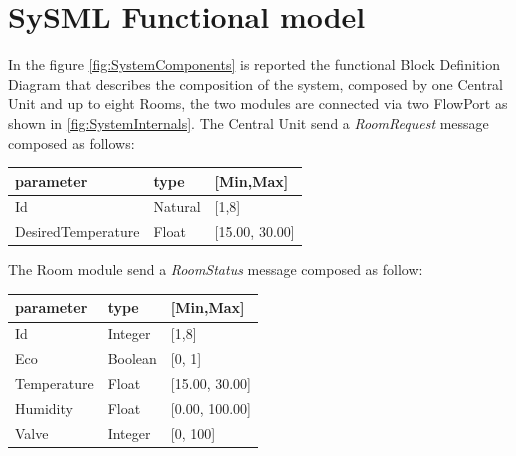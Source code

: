 \section{SySML Functional model}
In the figure \ref{fig:SystemComponents} is reported the functional Block Definition Diagram that describes the composition of the system, composed by one Central Unit and up to eight Rooms, the two modules are connected via two FlowPort as shown in \ref{fig:SystemInternals}.
The Central Unit send a \textit{RoomRequest} message composed as follows:
\begin{center}
	\begin{tabular}{||l | l| l ||} 
		\hline
		\textbf{parameter} 	& \textbf{type} & \textbf{[Min,Max]}\\ 
		\hline
		Id 					&  Natural & [1,8] \\ 
		\hline
		DesiredTemperature 	&  Float & [15.00, 30.00] \\ 
		\hline
	\end{tabular}
\end{center}
The Room module send a \textit{RoomStatus} message composed as follow:
\begin{center}
	\begin{tabular}{||l | l| l ||} 
		\hline
		\textbf{parameter} 	& \textbf{type} & \textbf{[Min,Max]}\\ 
		\hline
		Id 					&  Integer & [1,8] \\ 
		\hline
		Eco				 	&  Boolean & [0, 1] \\ 
		\hline
		Temperature			&  Float & [15.00, 30.00] \\ 
		\hline
		Humidity			&  Float & [0.00, 100.00] \\ 
		\hline
		Valve				&  Integer & [0, 100] \\ 
		\hline
	\end{tabular}
\end{center}

